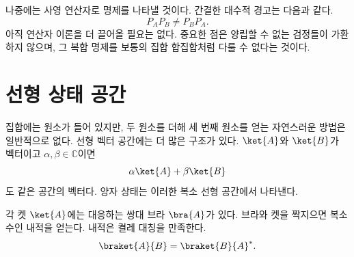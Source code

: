\begin{classroomqa}
\end{classroomqa}

\begin{classroomqa}
\end{classroomqa}

나중에는 사영 연산자로 명제를 나타낼 것이다. 간결한 대수적 경고는 다음과 같다.
\begin{equation}
P_A P_B\ne P_B P_A.
\end{equation}
아직 연산자 이론을 더 끌어올 필요는 없다. 중요한 점은 양립할 수 없는 검정들이 가환하지 않으며, 그 복합 명제를 보통의 집합 합집합처럼 다룰 수 없다는 것이다.

\begin{classroomqa}
\end{classroomqa}

\section{선형 상태 공간}

집합에는 원소가 들어 있지만, 두 원소를 더해 세 번째 원소를 얻는 자연스러운 방법은 일반적으로 없다. 선형 벡터 공간에는 더 많은 구조가 있다. \(\ket{A}\)와 \(\ket{B}\)가 벡터이고 \(\alpha,\beta\in\mathbb C\)이면
\begin{equation}
\alpha\ket{A}+\beta\ket{B}
\end{equation}
도 같은 공간의 벡터다. 양자 상태는 이러한 복소 선형 공간에서 나타낸다.

각 켓 \(\ket{A}\)에는 대응하는 쌍대 브라 \(\bra{A}\)가 있다. 브라와 켓을 짝지으면 복소수인 내적을 얻는다. 내적은 켤레 대칭을 만족한다.
\begin{equation}
\braket{A}{B}=\braket{B}{A}^{*}.
\label{eq:conjugate-symmetry}
\end{equation}

